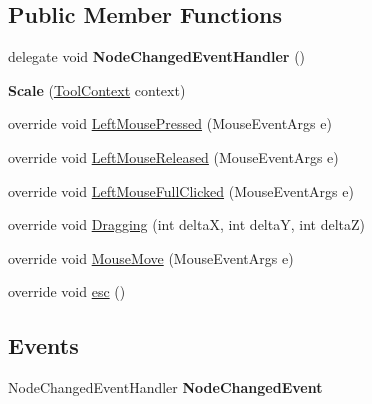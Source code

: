\subsection*{Public Member Functions}
\begin{DoxyCompactItemize}
\item 
\hypertarget{class_interface_graphique_1_1_tools_1_1_scale_ac1db83864b0144e9227e48bd51ac490d}{}delegate void {\bfseries Node\+Changed\+Event\+Handler} ()\label{class_interface_graphique_1_1_tools_1_1_scale_ac1db83864b0144e9227e48bd51ac490d}

\item 
\hypertarget{class_interface_graphique_1_1_tools_1_1_scale_adc4fab6ae3be7af401e10d5ab2c9c449}{}{\bfseries Scale} (\hyperlink{class_interface_graphique_1_1_tools_1_1_tool_context}{Tool\+Context} context)\label{class_interface_graphique_1_1_tools_1_1_scale_adc4fab6ae3be7af401e10d5ab2c9c449}

\item 
override void \hyperlink{class_interface_graphique_1_1_tools_1_1_scale_a25847a69fbbb90869af28ad831fbee9a}{Left\+Mouse\+Pressed} (Mouse\+Event\+Args e)
\item 
override void \hyperlink{class_interface_graphique_1_1_tools_1_1_scale_a5ab44f398247a5a1e79523372f2aa639}{Left\+Mouse\+Released} (Mouse\+Event\+Args e)
\item 
override void \hyperlink{class_interface_graphique_1_1_tools_1_1_scale_a46260c1876745b5b09c73f69235d35fc}{Left\+Mouse\+Full\+Clicked} (Mouse\+Event\+Args e)
\item 
override void \hyperlink{class_interface_graphique_1_1_tools_1_1_scale_acf2e415f052d5145b5f80b2fea0993cb}{Dragging} (int delta\+X, int delta\+Y, int delta\+Z)
\item 
override void \hyperlink{class_interface_graphique_1_1_tools_1_1_scale_aac4bb7da59fdb782e8ac30fb10324398}{Mouse\+Move} (Mouse\+Event\+Args e)
\item 
override void \hyperlink{class_interface_graphique_1_1_tools_1_1_scale_a017877e628f6a5f5a0385d0516831adc}{esc} ()
\end{DoxyCompactItemize}
\subsection*{Events}
\begin{DoxyCompactItemize}
\item 
\hypertarget{class_interface_graphique_1_1_tools_1_1_scale_aee9204f960a68563b18f251f54dbbb5e}{}Node\+Changed\+Event\+Handler {\bfseries Node\+Changed\+Event}\label{class_interface_graphique_1_1_tools_1_1_scale_aee9204f960a68563b18f251f54dbbb5e}

\end{DoxyCompactItemize}


